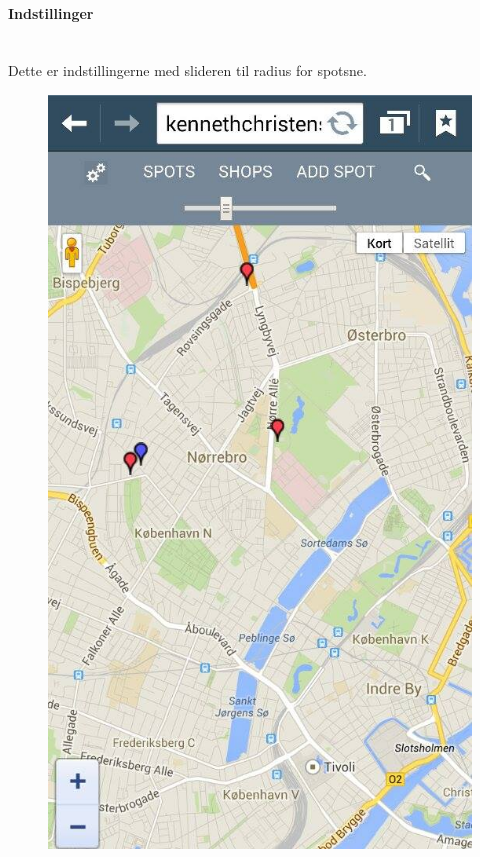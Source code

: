 \documentclass[12pt]{article}
\begin{document}
\newpage
\paragraph{Indstillinger}\mbox{}\\
Dette er indstillingerne med slideren til radius for spotsne.\\
\begin{figure}[h]
\includegraphics[scale = 0.3]{msettings}
\end{figure}
\end{document}
